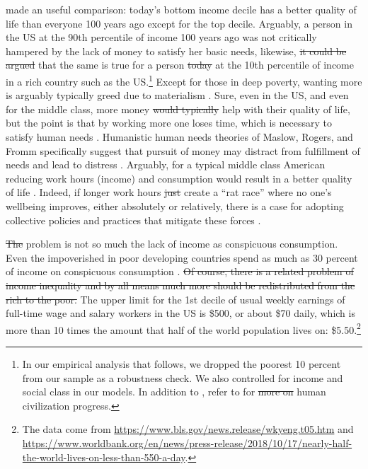 \documentclass[10pt, letterpaper]{article}
\providecommand{\DIFaddtex}[1]{{\protect\color{blue}\uwave{#1}}} %
\providecommand{\DIFdeltex}[1]{{\protect\color{red}\sout{#1}}}                      %
\providecommand{\DIFaddbegin}{} %
\providecommand{\DIFaddend}{} %
\providecommand{\DIFdelbegin}{} %
\providecommand{\DIFdelend}{} %
\providecommand{\DIFadd}[1]{\texorpdfstring{\DIFaddtex{#1}}{#1}} %
\providecommand{\DIFdel}[1]{\texorpdfstring{\DIFdeltex{#1}}{}} %
\newcommand{\DIFscaledelfig}{0.5}
\newlength{\DIFdelgraphicswidth} %
\newlength{\DIFdelgraphicsheight} %
\newcommand{\DIFaddincludegraphics}[2][]{{\color{blue}\fbox{\DIFOincludegraphics[#1]{#2}}}} %
\newcommand{\DIFdelincludegraphics}[2][]{%
\sbox{\DIFdelgraphicsbox}{\DIFOincludegraphics[#1]{#2}}%
\settoboxwidth{\DIFdelgraphicswidth}{\DIFdelgraphicsbox} %
\settoboxtotalheight{\DIFdelgraphicsheight}{\DIFdelgraphicsbox} %
\scalebox{\DIFscaledelfig}{%
\parbox[b]{\DIFdelgraphicswidth}{\usebox{\DIFdelgraphicsbox}\\[-\baselineskip] \rule{\DIFdelgraphicswidth}{0em}}\llap{\resizebox{\DIFdelgraphicswidth}{\DIFdelgraphicsheight}{%
\setlength{\unitlength}{\DIFdelgraphicswidth}%
\begin{picture}(1,1)%
\thicklines\linethickness{2pt} %
{\color[rgb]{1,0,0}\put(0,0){\framebox(1,1){}}}%
{\color[rgb]{1,0,0}\put(0,0){\line( 1,1){1}}}%
{\color[rgb]{1,0,0}\put(0,1){\line(1,-1){1}}}%
\end{picture}%
}\hspace*{3pt}}} %
} %
\DeclareRobustCommand{\DIFaddbegin}{\DIFOaddbegin \let\includegraphics\DIFaddincludegraphics} %
\DeclareRobustCommand{\DIFaddend}{\DIFOaddend \let\includegraphics\DIFOincludegraphics} %
\DeclareRobustCommand{\DIFdelbegin}{\DIFOdelbegin \let\includegraphics\DIFdelincludegraphics} %
\DeclareRobustCommand{\DIFdelend}{\DIFOaddend \let\includegraphics\DIFOincludegraphics} %
\begin{document}
\begin{spacing}{1.8}
\citet{bok10} made an useful comparison: today's bottom income decile has a
better quality of life than everyone 100 years ago except for the top
decile. Arguably, a person in the US at the 90th percentile of income 100 years
ago was not critically hampered by the lack of money to satisfy her basic needs,
likewise, \DIFdelbegin \DIFdel{it could be argued }\DIFdelend \DIFaddbegin \DIFadd{we argue }\DIFaddend that the same is true for a person  \DIFdelbegin \DIFdel{today }\DIFdelend at the 10th percentile of
income \DIFaddbegin \DIFadd{today }\DIFaddend in a rich country such as the US.\footnote{In our empirical analysis that follows, we dropped the poorest 10 percent from our sample as a robustness check. We also controlled for income and social class in our models. In addition to
  \citet{bok10}, refer to \citet[e.g.,][]{pinker18} for \DIFdelbegin \DIFdel{more on }\DIFdelend human civilization progress.}
Except for those in deep poverty, wanting more is arguably typically greed due
to materialism \DIFaddbegin \DIFadd{and consumerism}\DIFaddend .
Sure, even in the US, and even for the middle class, more money \DIFdelbegin \DIFdel{would typically }\DIFdelend \DIFaddbegin \DIFadd{could often }\DIFaddend help
with their quality of life, but the point is that by working more one loses
time, which is necessary to satisfy human needs \citep{maslow87}. Humanistic human needs theories of Maslow, Rogers, and Fromm  
 specifically suggest that pursuit of money may distract from fulfillment of
 needs and lead to distress \citep[cited in][]{kasser93}.
 Arguably, for a typical middle class American reducing work hours (income) and
 consumption would result in a better quality of life
 \citep{dittmar14,kasser13,hsee13,leonard10}.
 Indeed, if longer work hours \DIFdelbegin \DIFdel{just }\DIFdelend create a ``rat race'' where no one's wellbeing improves, either absolutely or relatively, there is a case for adopting collective policies and practices that mitigate these forces \citep{jauch2020rat,hamermesh2017does,golden2009brief}.

\DIFdelbegin \DIFdel{The }\DIFdelend \DIFaddbegin \DIFadd{In the US the }\DIFaddend problem is not so much the lack of income as conspicuous consumption.  
Even the impoverished in poor developing countries spend as much as 30 percent of income on conspicuous consumption \citep{banerjee11}. \DIFdelbegin \DIFdel{Of course, there is a related problem of income inequality and by all means much more should be redistributed from the rich to the poor. }\DIFdelend %
 The upper limit for the 1st decile of usual weekly earnings of full-time wage and salary workers in the US is \$500, or about \$70 daily, which is more than 10
times the amount that half of the world population lives on:
\$5.50.\footnote{The data come from
  \url{https://www.bls.gov/news.release/wkyeng.t05.htm} and
  \url{https://www.worldbank.org/en/news/press-release/2018/10/17/nearly-half-the-world-lives-on-less-than-550-a-day}.}
\DIFaddbegin 


\end{spacing}
\end{document}
